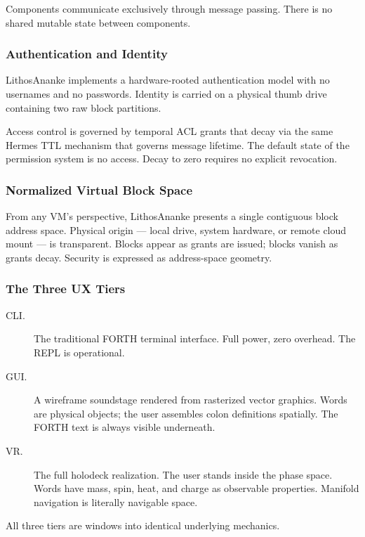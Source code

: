 Components communicate exclusively through message passing. There is no
shared mutable state between components.

\subsubsection{Authentication and Identity}

LithosAnanke implements a hardware-rooted authentication model with no
usernames and no passwords. Identity is carried on a physical thumb drive
containing two raw block partitions.

Access control is governed by temporal ACL grants that decay via the same
Hermes TTL mechanism that governs message lifetime. The default state of
the permission system is no access. Decay to zero requires no explicit
revocation.

\subsubsection{Normalized Virtual Block Space}

From any VM's perspective, LithosAnanke presents a single contiguous block
address space. Physical origin — local drive, system hardware, or remote
cloud mount — is transparent. Blocks appear as grants are issued; blocks
vanish as grants decay. Security is expressed as address-space geometry.

\subsubsection{The Three UX Tiers}

\begin{description}
  \item[CLI.] The traditional FORTH terminal interface. Full power, zero
        overhead. The REPL is operational.
  \item[GUI.] A wireframe soundstage rendered from rasterized vector
        graphics. Words are physical objects; the user assembles colon
        definitions spatially. The FORTH text is always visible underneath.
  \item[VR.] The full holodeck realization. The user stands inside the phase
        space. Words have mass, spin, heat, and charge as observable
        properties. Manifold navigation is literally navigable space.
\end{description}

All three tiers are windows into identical underlying mechanics.

